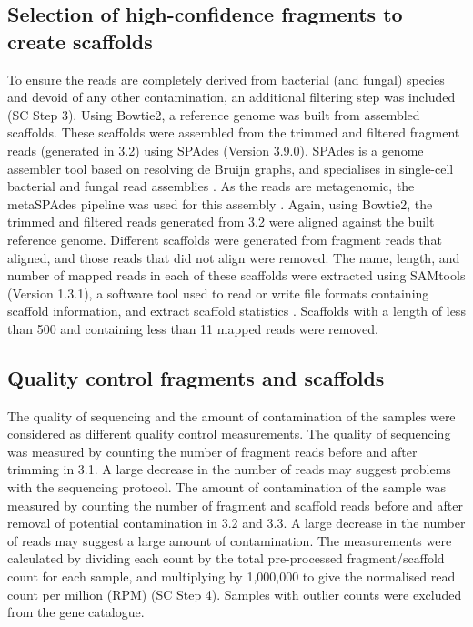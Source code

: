 \documentclass[a4paper]{article}
\begin{document}
\subsection{Selection of high-confidence fragments to create scaffolds}
To ensure the reads are completely derived from bacterial (and fungal) species and devoid of any other contamination, an additional filtering step was included (SC Step 3). Using Bowtie2, a reference genome was built from assembled scaffolds. These scaffolds were assembled from the trimmed and filtered fragment reads (generated in 3.2) using SPAdes (Version 3.9.0). SPAdes is a genome assembler tool based on resolving de Bruijn graphs, and specialises in single-cell bacterial and fungal read assemblies \cite{bankevich_spades:_2012}. As the reads are metagenomic, the metaSPAdes pipeline was used for this assembly \cite{nurk_metaspades:_2017}. Again, using Bowtie2, the trimmed and filtered reads generated from 3.2 were aligned against the built reference genome. Different scaffolds were generated from fragment reads that aligned, and those reads that did not align were removed. The name, length, and number of mapped reads in each of these scaffolds were extracted using SAMtools (Version 1.3.1), a software tool used to read or write file formats containing scaffold information, and extract scaffold statistics \cite{li_sequence_2009}. Scaffolds with a length of less than 500 and containing less than 11 mapped reads were removed.

\subsection{Quality control fragments and scaffolds}
The quality of sequencing and the amount of contamination of the samples were considered as different quality control measurements. The quality of sequencing was measured by counting the number of fragment reads before and after trimming in 3.1. A large decrease in the number of reads may suggest problems with the sequencing protocol. The amount of contamination of the sample was measured by counting the number of fragment and scaffold reads before and after removal of potential contamination in 3.2 and 3.3. A large decrease in the number of reads may suggest a large amount of contamination. The measurements were calculated by dividing each count by the total pre-processed fragment/scaffold count for each sample, and multiplying by 1,000,000 to give the normalised read count per million (RPM) (SC Step 4). Samples with outlier counts were excluded from the gene catalogue.
\end{document}
